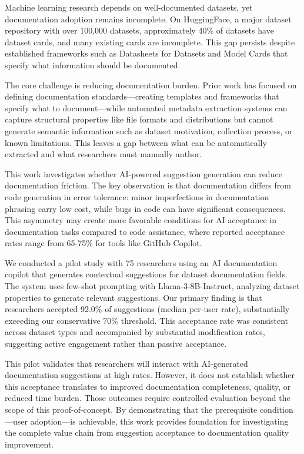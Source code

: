 
Machine learning research depends on well-documented datasets, yet documentation adoption remains incomplete. On HuggingFace, a major dataset repository with over 100,000 datasets, approximately 40\% of datasets have dataset cards, and many existing cards are incomplete. This gap persists despite established frameworks such as Datasheets for Datasets and Model Cards that specify what information should be documented.

The core challenge is reducing documentation burden. Prior work has focused on defining documentation standards—creating templates and frameworks that specify what to document—while automated metadata extraction systems can capture structural properties like file formats and distributions but cannot generate semantic information such as dataset motivation, collection process, or known limitations. This leaves a gap between what can be automatically extracted and what researchers must manually author.

This work investigates whether AI-powered suggestion generation can reduce documentation friction. The key observation is that documentation differs from code generation in error tolerance: minor imperfections in documentation phrasing carry low cost, while bugs in code can have significant consequences. This asymmetry may create more favorable conditions for AI acceptance in documentation tasks compared to code assistance, where reported acceptance rates range from 65-75\% for tools like GitHub Copilot.

We conducted a pilot study with 75 researchers using an AI documentation copilot that generates contextual suggestions for dataset documentation fields. The system uses few-shot prompting with Llama-3-8B-Instruct, analyzing dataset properties to generate relevant suggestions. Our primary finding is that researchers accepted 92.0\% of suggestions (median per-user rate), substantially exceeding our conservative 70\% threshold. This acceptance rate was consistent across dataset types and accompanied by substantial modification rates, suggesting active engagement rather than passive acceptance.

This pilot validates that researchers will interact with AI-generated documentation suggestions at high rates. However, it does not establish whether this acceptance translates to improved documentation completeness, quality, or reduced time burden. Those outcomes require controlled evaluation beyond the scope of this proof-of-concept. By demonstrating that the prerequisite condition—user adoption—is achievable, this work provides foundation for investigating the complete value chain from suggestion acceptance to documentation quality improvement.
